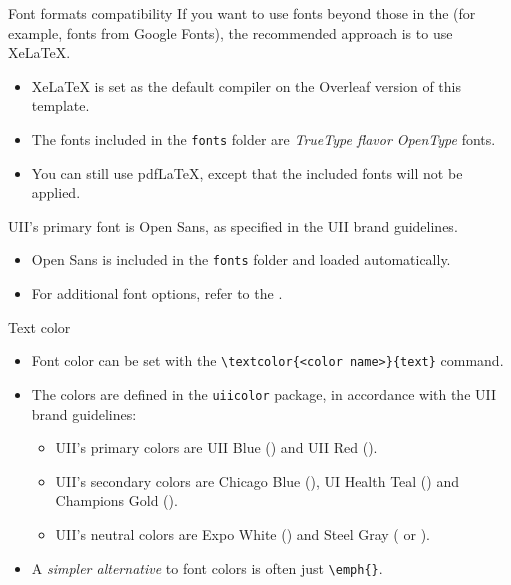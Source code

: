 \begin{frame}[fragile]{Font formats compatibility}
If you want to use fonts beyond those in the  (for example, fonts from Google Fonts), the recommended approach is to use XeLaTeX.
\begin{itemize}
\item XeLaTeX is set as the default compiler on the Overleaf version of this template.
\item The fonts included in the \verb|fonts| folder are \emph{TrueType flavor OpenType} fonts.
\item You can still use pdfLaTeX, except that the included fonts will not be applied.
\end{itemize}
UII's primary font is Open Sans, as specified in the UII brand guidelines.
\begin{itemize}
\item Open Sans is included in the \verb|fonts| folder and loaded automatically.
\item For additional font options, refer to the .
\end{itemize}
\end{frame}


\begin{frame}[fragile]{Text color}
\begin{itemize}
\item Font color can be set with the \verb|\textcolor{<color name>}{text}| command.
\item The colors are defined in the \texttt{uiicolor} package, in accordance with the UII brand guidelines:
  \begin{itemize}
  \item UII's primary colors are UII Blue () and UII Red ().
  \item UII's secondary colors are Chicago Blue (), UI Health Teal () and Champions Gold ().
  \item UII's neutral colors are Expo White () and Steel Gray ( or ).
  \end{itemize}
\item A \emph{simpler alternative} to font colors is often just \verb|\emph{}|.
\end{itemize}
\end{frame}


